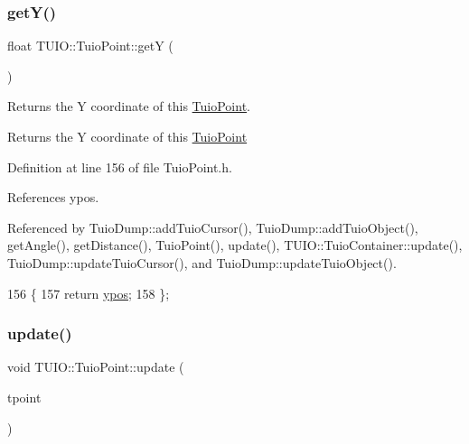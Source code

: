\subsubsection{\texorpdfstring{get\+Y()}{getY()}}
{\footnotesize\ttfamily float T\+U\+I\+O\+::\+Tuio\+Point\+::getY (\begin{DoxyParamCaption}{ }\end{DoxyParamCaption})\hspace{0.3cm}{\ttfamily [inline]}}

Returns the Y coordinate of this \hyperlink{class_t_u_i_o_1_1_tuio_point}{Tuio\+Point}. \begin{DoxyReturn}{Returns}
the Y coordinate of this \hyperlink{class_t_u_i_o_1_1_tuio_point}{Tuio\+Point} 
\end{DoxyReturn}


Definition at line 156 of file Tuio\+Point.\+h.



References ypos.



Referenced by Tuio\+Dump\+::add\+Tuio\+Cursor(), Tuio\+Dump\+::add\+Tuio\+Object(), get\+Angle(), get\+Distance(), Tuio\+Point(), update(), T\+U\+I\+O\+::\+Tuio\+Container\+::update(), Tuio\+Dump\+::update\+Tuio\+Cursor(), and Tuio\+Dump\+::update\+Tuio\+Object().


\begin{DoxyCode}
156                      \{
157             \textcolor{keywordflow}{return} \hyperlink{class_t_u_i_o_1_1_tuio_point_a89a038775a681166168735dbc95c7779}{ypos};
158         \};
\end{DoxyCode}
\mbox{\label{class_t_u_i_o_1_1_tuio_point_aa1cc8711747080dd00eb50577d73d038}} 
\subsubsection{\texorpdfstring{update()}{update()}\hspace{0.1cm}{\footnotesize\ttfamily [1/3]}}
{\footnotesize\ttfamily void T\+U\+I\+O\+::\+Tuio\+Point\+::update (\begin{DoxyParamCaption}\item[{\hyperlink{class_t_u_i_o_1_1_tuio_point}{Tuio\+Point} $\ast$}]{tpoint }\end{DoxyParamCaption})\hspace{0.3cm}{\ttfamily [inline]}}

